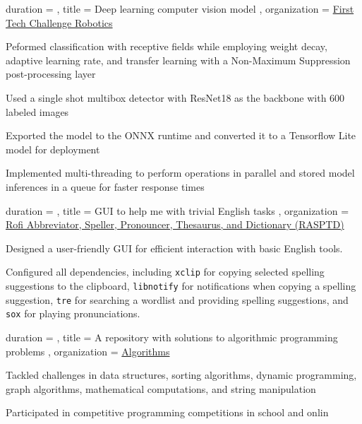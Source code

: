 \documentclass[sidebar-width=2.25in, primary=slate]{clean-resume}
\begin{document}
    \begin{experience}
      {
        duration = {  },
        title = { Deep learning computer vision model },
        organization = {\href{https://github.com/FIRST-Tech-Challenge/FtcRobotController}{First Tech Challenge Robotics} }
      }
      \item Peformed classification with receptive fields while employing weight decay, adaptive learning rate, and transfer learning with a Non-Maximum Suppression post-processing layer
      \item Used a single shot multibox detector with ResNet18 as the backbone with 600 labeled images
      \item Exported the model to the ONNX runtime and converted it to a Tensorflow Lite model for deployment
      \item Implemented multi-threading to perform operations in parallel and stored model inferences in a queue for faster response times
    \end{experience}

    \begin{experience}
      {
        duration = {  },
        title = { GUI to help me with trivial English tasks },
        organization = { \href{https://github.com/anishgoyal1108/RASPTD}{Rofi Abbreviator, Speller, Pronouncer, Thesaurus, and Dictionary (RASPTD)} }
      }
      \item Designed a user-friendly GUI for efficient interaction with basic English tools.
      \item Configured all dependencies, including \verb|xclip| for copying selected spelling suggestions to the clipboard, \verb|libnotify| for notifications when copying a spelling suggestion, \verb|tre| for searching a wordlist and providing spelling suggestions, and \verb|sox| for playing pronunciations.
    \end{experience}
    
    \begin{experience}
      {
        duration = {  },
        title = { A repository with solutions to algorithmic programming problems },
        organization = { \href{https://github.com/Yubo-Cao/algorithms}{Algorithms} }
      }
      \item Tackled challenges in data structures, sorting algorithms, dynamic programming, graph algorithms, mathematical computations, and string manipulation
      \item Participated in competitive programming competitions in school and onlin
    \end{experience}
\end{document}
